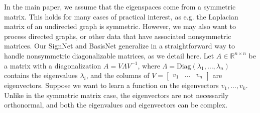 \documentclass{article} \usepackage{iclr2023_conference,times}
\newcommand{\RR}{\mathbb R}
\newcommand{\mrm}[1]{\mathrm{#1}}
\begin{document}
In the main paper, we assume that the eigenspaces come from a symmetric matrix. This holds for many cases of practical interest, as e.g. the Laplacian matrix of an undirected graph is symmetric. However, we may also want to process directed graphs, or other data that have associated nonsymmetric matrices. Our SignNet and BasisNet generalize in a straightforward way to handle nonsymmetric diagonalizable matrices, as we detail here. Let $A \in \RR^{n \times n}$ be a matrix with a diagonalization $A = V \Lambda V^{-1}$, where $\Lambda = \mrm{Diag}(\lambda_1, \ldots, \lambda_n)$ contains the eigenvalues $\lambda_i$, and the columns of $V = \begin{bmatrix} v_1 & \ldots & v_n \end{bmatrix}$ are eigenvectors. Suppose we want to learn a function on the eigenvectors $v_1, \ldots, v_k$. Unlike in the symmetric matrix case, the eigenvectors are not necessarily orthonormal, and both the eigenvalues and eigenvectors can be complex.
\end{document}
